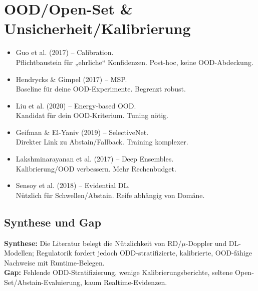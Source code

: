 \section{OOD/Open-Set \& Unsicherheit/Kalibrierung}
\begin{itemize}
  \item Guo et al. (2017) – Calibration.\\
      {Pflichtbaustein für „ehrliche“ Konfidenzen.}
      {Post-hoc, keine OOD-Abdeckung.}

  \item Hendrycks \& Gimpel (2017) – MSP.\\
      {Baseline für deine OOD-Experimente.}
      {Begrenzt robust.}

  \item Liu et al. (2020) – Energy-based OOD.\\
      {Kandidat für dein OOD-Kriterium.}
      {Tuning nötig.}

  \item Geifman \& El-Yaniv (2019) – SelectiveNet.\\
      {Direkter Link zu Abstain/Fallback.}
      {Training komplexer.}

  \item Lakshminarayanan et al. (2017) – Deep Ensembles.\\
      {Kalibrierung/OOD verbessern.}
      {Mehr Rechenbudget.}

  \item Sensoy et al. (2018) – Evidential DL.\\
      {Nützlich für Schwellen/Abstain.}
      {Reife abhängig von Domäne.}
\end{itemize}

\subsection*{Synthese und Gap}
\noindent\textbf{Synthese:} Die Literatur belegt die Nützlichkeit von RD/\(\mu\)-Doppler und DL-Modellen; Regulatorik fordert jedoch ODD-stratifizierte, kalibrierte, OOD-fähige Nachweise mit Runtime-Belegen.\\
\textbf{Gap:} Fehlende ODD-Stratifizierung, wenige Kalibrierungsberichte, seltene Open-Set/Abstain-Evaluierung, kaum Realtime-Evidenzen.
